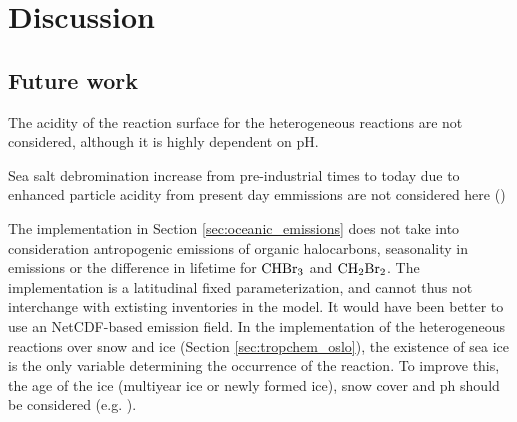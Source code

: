 \setcounter{chapter}{7}
\chapter{Discussion}


\section{Future work}

The acidity of the reaction surface for the heterogeneous reactions are not considered, although it is highly dependent on pH. 

\medskip
Sea salt debromination increase from pre-industrial times to today due to enhanced particle acidity from present day emmissions are not considered here (\cite{Parella})

\medskip
The implementation in Section \ref{sec:oceanic_emissions} does not take into consideration antropogenic emissions of organic halocarbons, seasonality in emissions or the difference in lifetime for $\mathrm{CHBr_3}$ and $\mathrm{CH_2Br_2}$. The implementation is a latitudinal fixed parameterization, and cannot thus not interchange with extisting inventories in the model. It would have been better to use an NetCDF-based emission field. 
\medskip
In the implementation of the heterogeneous reactions over snow and ice (Section \ref{sec:tropchem_oslo}), the existence of sea ice is the only variable determining the occurrence of the reaction. To improve this, the age of the ice (multiyear ice or newly formed ice), snow cover and ph should be considered (e.g. \cite{Peterson2019}).
